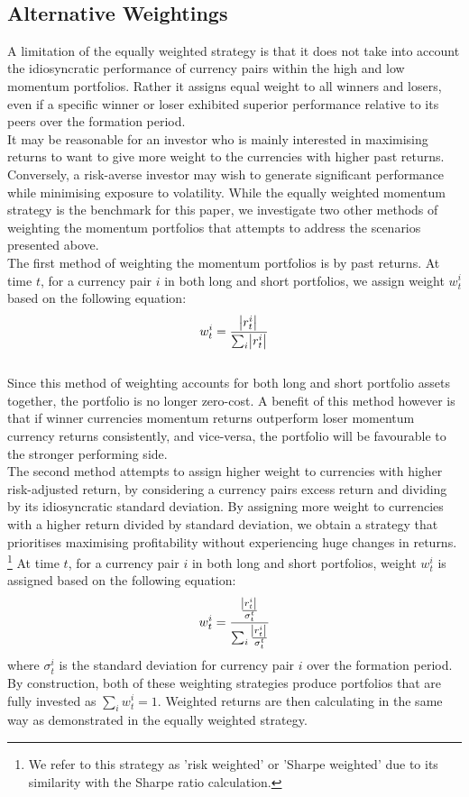\documentclass{article}
\begin{document}
\\
\subsection{Alternative Weightings}
 A limitation of the equally weighted strategy is that it does not take into account the idiosyncratic performance of currency pairs within the high and low momentum portfolios. Rather it assigns equal weight to all winners and losers, even if a specific winner or loser exhibited superior performance relative to its peers over the formation period.\\
 
It may be reasonable for an investor who is mainly interested in maximising returns to want to give more weight to the currencies with higher past returns. Conversely, a risk-averse investor may wish to generate significant performance while minimising exposure to volatility. 
While the equally weighted momentum strategy is the benchmark for this paper, we investigate two other methods of weighting the momentum portfolios that attempts to address the scenarios presented above.
\\ 

The first method of weighting the momentum portfolios is by past returns. At time $t$, for a currency pair $i$ in both long and short portfolios, we assign weight $w^i_t$ based on the following equation:
$$w^i_t = \frac{\abs{r^i_t}}{\sum_i{\abs{r^i_t}}} $$
\\

Since this method of weighting accounts for both long and short portfolio assets together, the portfolio is no longer zero-cost. A benefit of this method however is that if winner currencies momentum returns outperform loser momentum currency returns consistently, and vice-versa, the portfolio will be favourable to the stronger performing side.
\\

The second method attempts to assign higher weight to currencies with higher risk-adjusted return, by considering a currency pairs excess return and dividing by its idiosyncratic standard deviation. By assigning more weight to currencies with a higher return divided by standard deviation, we obtain a strategy that prioritises maximising profitability without experiencing huge changes in returns. \footnote{We refer to this strategy as 'risk weighted' or 'Sharpe weighted' due to its similarity with the Sharpe ratio calculation.} At time $t$, for a currency pair $i$ in both long and short portfolios, weight $w^i_t$ is assigned based on the following equation:
$$w^i_t = \frac{\frac{\abs{r^i_t}}{\sigma^t_t}}{\sum_i{\frac{\abs{r^i_t}}{\sigma^t_t}}}$$
where $\sigma^i_t$ is the standard deviation for currency pair $i$ over the formation period.
\\
By construction, both of these weighting strategies produce portfolios that are fully invested as $\sum_i{w^i_t} = 1$.
Weighted returns are then calculating in the same way as demonstrated in the equally weighted strategy.
\\
\end{document}
